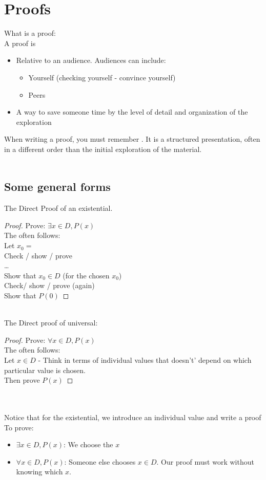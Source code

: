 \documentclass[12pt, letterpaper, twoside]{article}
\begin{document}

\section{Proofs}
What is a proof:\\
A proof is
\begin{itemize}
	\item Relative to an audience. Audiences can include:
	\begin{itemize}
		\item Yourself (checking yourself - convince yourself)
		\item Peers
	\end{itemize}
	\item A way to save someone time by the level of detail and organization of the exploration
\end{itemize}

When writing a proof, you must remember . It is a structured presentation, often in a different
order than the initial exploration of the material.
\\
\\
\subsection{Some general forms}
The Direct Proof of an existential.
\begin{proof}
	Prove: $\exists x \in D, P(x)$\\
	The  often follows:\\
	Let $x_0 = $ \\
	Check / show / prove\\
	\dots \\
	Show that $x_0 \in D$ (for the chosen $x_0$)\\
	Check/ show / prove (again)\\
	Show that $P(0)$
\end{proof}
\\
The Direct proof of universal:
\begin{proof}
	Prove: $\forall x \in D, P(x)$\\
	The  often follows:\\
	Let $x \in D$ - Think in terms of individual values that doesn't' depend on which particular value is chosen.
	\\
	Then prove $P(x)$
\end{proof}
\\
\\
Notice that for the existential, we introduce an individual value and write a proof 
\\
\newpage
To prove:
\begin{itemize}
	\item $\exists x \in D, P(x)$: We choose the $x$
	\item $\forall x \in D, P(x)$: Someone else chooses $x \in D$. Our proof must work without knowing which $x$.
\end{itemize}
\end{document}
